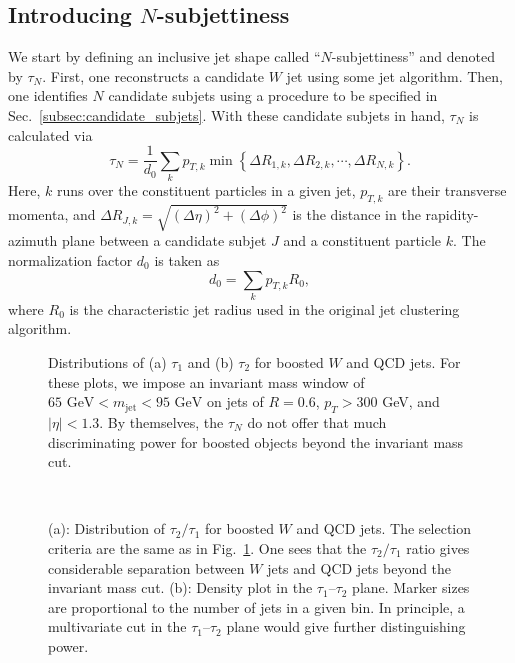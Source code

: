 \documentclass{JHEP3}
\newcommand{\vsh}{\vspace{-.5cm}}
\DeclareRobustCommand{\Sec}[1]{Sec.~\ref{#1}}
\DeclareRobustCommand{\Fig}[1]{Fig.~\ref{#1}}
\newcommand{\be}{\begin{equation}}
\newcommand{\ee}{\end{equation}}
\begin{document}
\subsection{Introducing $N$-subjettiness}

We start by defining an inclusive jet shape called ``$N$-subjettiness'' and denoted by $\tau_N$.  First, one reconstructs a candidate $W$ jet using some jet algorithm.  Then, one identifies $N$ candidate subjets using a procedure to be specified in \Sec{subsec:candidate_subjets}.  With these candidate subjets in hand, $\tau_N$ is calculated via
\begin{equation}
 \tau_N = \frac{1}{d_0} \sum\limits_k p_{T,k} \min \left\lbrace \Delta R _{1,k}, \Delta R _{2,k}, \cdots, \Delta R _{N,k} \right\rbrace.
 \label{eq:tau_N}
\end{equation}
Here, $k$ runs over the constituent particles in a given jet, $p_{T,k}$ are their transverse momenta, and $ \Delta R_{J,k} = \sqrt{(\Delta \eta)^2+(\Delta \phi)^2}$ is the distance in the rapidity-azimuth plane between a candidate subjet $J$ and a constituent particle $k$.  The normalization factor $d_0$ is taken as
\be
d_0 = \sum\limits_k p_{T,k} R_0,
\ee
where $R_0$ is the characteristic jet radius used in the original jet clustering algorithm.  


\begin{figure}[tp]
  \begin{center}
  \end{center}
  \vsh
\caption{Distributions of (a) $\tau_1$ and (b) $\tau_2$ for boosted $W$ and QCD jets.  For these plots, we impose an invariant mass window of $65 \text{ GeV} < m_{\text{jet}} < 95 \text{ GeV}$ on jets of $R = 0.6$, $p_T > 300$ GeV, and $|\eta| < 1.3$.  By themselves, the $\tau_N$ do not offer that much discriminating power for boosted objects beyond the invariant mass cut.}
  \label{fig:1Dtau1tau2tau3w}
\end{figure}

\begin{figure}[tp]
  \begin{center}
       \\
  \end{center}
  \vsh
  \caption{(a): Distribution of $\tau_2/\tau_1$ for boosted $W$ and QCD jets.  The selection criteria are the same as in \Fig{fig:1Dtau1tau2tau3w}.  One sees that the $\tau_2/\tau_1$ ratio gives considerable separation between $W$ jets and QCD jets beyond the invariant mass cut.  (b): Density plot in the $\tau_1$--$\tau_2$ plane.  Marker sizes are proportional to the number of jets in a given bin. In principle, a multivariate cut in the $\tau_1$--$\tau_2$ plane would give further distinguishing power.}
  \label{fig:W2Dtau12}
\end{figure}
\end{document}
